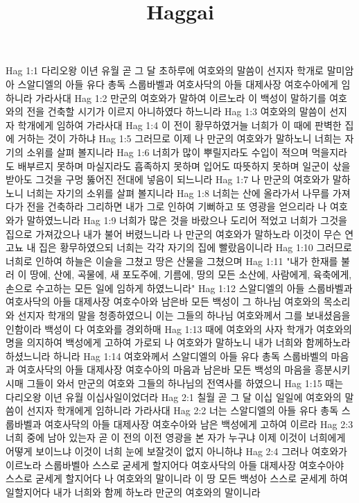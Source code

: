 

\title{Haggai}

Hag 1:1  다리오왕 이년 유월 곧 그 달 초하루에 여호와의 말씀이 선지자 학개로 말미암아 스알디엘의 아들 유다 총독 스룹바벨과 여호사닥의 아들 대제사장 여호수아에게 임하니라 가라사대
Hag 1:2  만군의 여호와가 말하여 이르노라 이 백성이 말하기를 여호와의 전을 건축할 시기가 이르지 아니하였다 하느니라
Hag 1:3  여호와의 말씀이 선지자 학개에게 임하여 가라사대
Hag 1:4  이 전이 황무하였거늘 너희가 이 때에 판벽한 집에 거하는 것이 가하냐
Hag 1:5  그러므로 이제 나 만군의 여호와가 말하노니 너희는 자기의 소위를 살펴 볼지니라
Hag 1:6  너희가 많이 뿌릴지라도 수입이 적으며 먹을지라도 배부르지 못하며 마실지라도 흡족하지 못하며 입어도 따뜻하지 못하며 일군이 삯을 받아도 그것을 구멍 뚫어진 전대에 넣음이 되느니라
Hag 1:7  나 만군의 여호와가 말하노니 너희는 자기의 소위를 살펴 볼지니라
Hag 1:8  너희는 산에 올라가서 나무를 가져다가 전을 건축하라 그리하면 내가 그로 인하여 기뻐하고 또 영광을 얻으리라 나 여호와가 말하였느니라
Hag 1:9  너희가 많은 것을 바랐으나 도리어 적었고 너희가 그것을 집으로 가져갔으나 내가 불어 버렸느니라 나 만군의 여호와가 말하노라 이것이 무슨 연고뇨 내 집은 황무하였으되 너희는 각각 자기의 집에 빨랐음이니라
Hag 1:10  그러므로 너희로 인하여 하늘은 이슬을 그쳤고 땅은 산물을 그쳤으며
Hag 1:11  "내가 한재를 불러 이 땅에, 산에, 곡물에, 새 포도주에, 기름에, 땅의 모든 소산에, 사람에게, 육축에게, 손으로 수고하는 모든 일에 임하게 하였느니라"
Hag 1:12  스알디엘의 아들 스룹바벨과 여호사닥의 아들 대제사장 여호수아와 남은바 모든 백성이 그 하나님 여호와의 목소리와 선지자 학개의 말을 청종하였으니 이는 그들의 하나님 여호와께서 그를 보내셨음을 인함이라 백성이 다 여호와를 경외하매
Hag 1:13  때에 여호와의 사자 학개가 여호와의 명을 의지하여 백성에게 고하여 가로되 나 여호와가 말하노니 내가 너희와 함께하노라 하셨느니라 하니라
Hag 1:14  여호와께서 스알디엘의 아들 유다 총독 스룹바벨의 마음과 여호사닥의 아들 대제사장 여호수아의 마음과 남은바 모든 백성의 마음을 흥분시키시매 그들이 와서 만군의 여호와 그들의 하나님의 전역사를 하였으니
Hag 1:15  때는 다리오왕 이년 유월 이십사일이었더라
Hag 2:1  칠월 곧 그 달 이십 일일에 여호와의 말씀이 선지자 학개에게 임하니라 가라사대
Hag 2:2  너는 스알디엘의 아들 유다 총독 스룹바벨과 여호사닥의 아들 대제사장 여호수아와 남은 백성에게 고하여 이르라
Hag 2:3  너희 중에 남아 있는자 곧 이 전의 이전 영광을 본 자가 누구냐 이제 이것이 너희에게 어떻게 보이느냐 이것이 너희 눈에 보잘것이 없지 아니하냐
Hag 2:4  그러나 여호와가 이르노라 스룹바벨아 스스로 굳세게 할지어다 여호사닥의 아들 대제사장 여호수아야 스스로 굳세게 할지어다 나 여호와의 말이니라 이 땅 모든 백성아 스스로 굳세게 하여 일할지어다 내가 너희와 함께 하노라 만군의 여호와의 말이니라
